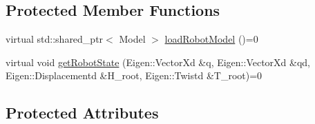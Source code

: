 \subsection*{Protected Member Functions}
\begin{DoxyCompactItemize}
\item 
virtual std\+::shared\+\_\+ptr$<$ Model $>$ \hyperlink{classocra__recipes_1_1ControllerServer_a50715d81293d3ec5f0d6a60710008510}{load\+Robot\+Model} ()=0
\item 
virtual void \hyperlink{classocra__recipes_1_1ControllerServer_a93ec150bea9b2a7a03aac1cc048d5484}{get\+Robot\+State} (Eigen\+::\+Vector\+Xd \&q, Eigen\+::\+Vector\+Xd \&qd, Eigen\+::\+Displacementd \&H\+\_\+root, Eigen\+::\+Twistd \&T\+\_\+root)=0
\end{DoxyCompactItemize}
\subsection*{Protected Attributes}
